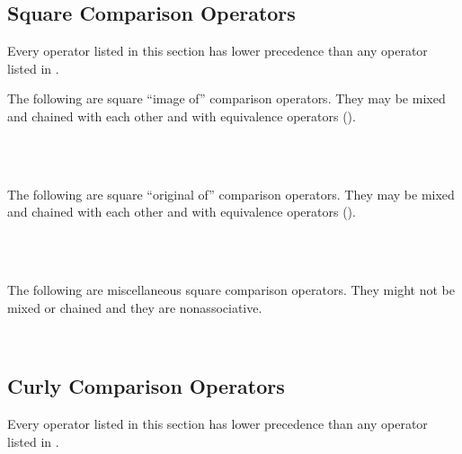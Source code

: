 \subsection{Square Comparison Operators}

Every operator listed in this section
has lower precedence than any operator listed in .

The following are square ``image of'' comparison operators.  They may be mixed and chained
with each other and with equivalence operators
().
\begin{tabbing}
\UnicodeKillLine
{} \\
 \\
\end{tabbing}

The following are square ``original of'' comparison operators.  They may be mixed and chained
with each other and with equivalence operators ().
\begin{tabbing}
\UnicodeKillLine
{} \\
 \\
\end{tabbing}

The following are miscellaneous square comparison operators.
They might not be mixed or chained and they are nonassociative.
\begin{tabbing}
\UnicodeKillLine
{} \\
\end{tabbing}

\subsection{Curly Comparison Operators}

Every operator listed in this section
has lower precedence than any operator listed in .

